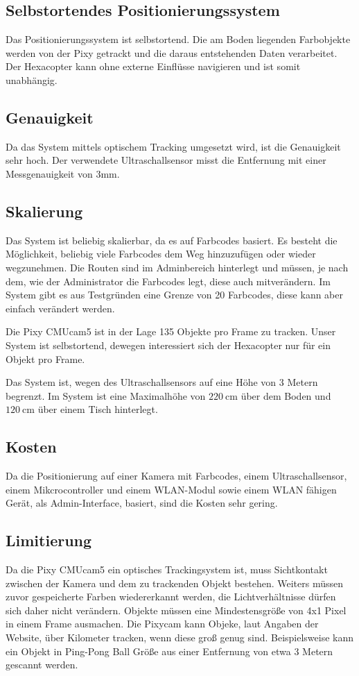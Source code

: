   \subsection*{Selbstortendes Positionierungssystem}
  Das Positionierungssystem ist selbstortend. Die am Boden liegenden Farbobjekte werden von der Pixy getrackt und die daraus entstehenden Daten verarbeitet. Der Hexacopter kann ohne externe Einflüsse navigieren und ist somit unabhängig.

  \subsection*{Genauigkeit}
  Da das System mittels optischem Tracking umgesetzt wird, ist die Genauigkeit sehr hoch.
  Der verwendete Ultraschallsensor misst die Entfernung mit einer Messgenauigkeit von 3mm.

  \subsection*{Skalierung}
  Das System ist beliebig skalierbar, da es auf Farbcodes basiert. Es besteht die Möglichkeit, beliebig viele Farbcodes dem Weg hinzuzufügen oder wieder wegzunehmen. Die Routen sind im Adminbereich hinterlegt und müssen, je nach dem, wie der Administrator die Farbcodes legt, diese auch mitverändern. Im System gibt es aus Testgründen eine Grenze von 20 Farbcodes, diese kann aber einfach verändert werden.

  Die Pixy CMUcam5 ist in der Lage 135 Objekte pro Frame zu tracken. Unser System ist selbstortend, dewegen interessiert sich der Hexacopter nur für ein Objekt pro Frame. \cite{PIXY_Porting_Examplecode}

  Das System ist, wegen des Ultraschallsensors auf eine Höhe von 3 Metern begrenzt. Im System ist eine Maximalhöhe von $\SI{220}{\centi\metre}$ über dem Boden und $\SI{120}{\centi\metre}$ über einem Tisch hinterlegt.

  \subsection*{Kosten}
  Da  die Positionierung auf einer Kamera mit Farbcodes, einem Ultraschallsensor, einem Mikcrocontroller und einem WLAN-Modul sowie einem WLAN fähigen Gerät, als Admin-Interface, basiert, sind die Kosten sehr gering.

  \subsection*{Limitierung}
  Da die Pixy CMUcam5 ein optisches Trackingsystem ist, muss Sichtkontakt zwischen der Kamera und dem zu trackenden Objekt bestehen. Weiters müssen zuvor gespeicherte Farben wiedererkannt werden, die Lichtverhältnisse dürfen sich daher nicht verändern.
  Objekte müssen eine Mindestensgröße von 4x1 Pixel in einem Frame ausmachen. Die Pixycam kann Objeke, laut Angaben der Website, über Kilometer tracken, wenn diese groß genug sind. Beispielsweise kann ein Objekt in Ping-Pong Ball Größe aus einer Entfernung von etwa 3 Metern gescannt werden. \cite{Pixy}

